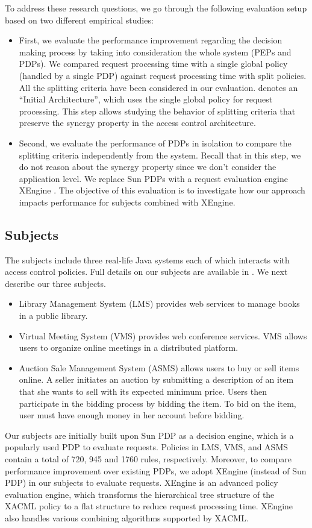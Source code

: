 To address these research questions, we go through the following evaluation setup based on two different empirical studies:
\begin{itemize}
\item First, we evaluate the performance improvement regarding the decision making process by taking into consideration the whole system 
(PEPs and PDPs). We compared request processing time with a single global policy (handled by a single PDP) against request processing time with
split policies. All the splitting criteria have been considered in our evaluation.
 denotes an ``Initial Architecture'', which uses the single global policy for request processing. 
This step allows studying the behavior of splitting criteria that preserve the synergy property in the access control architecture.

\item Second, we evaluate the performance of PDPs in isolation to compare the splitting criteria independently from the system.
Recall that in this step, we do not reason about the synergy property since we don't consider the application level.
We replace Sun PDPs with a request evaluation engine XEngine \cite{Xengine}. The objective of this evaluation is to investigate how our approach impacts performance for subjects combined with XEngine.
\end{itemize}

\subsection{Subjects}
The subjects include three real-life Java systems each of which interacts with access control policies. 
Full details on our subjects are available in \cite{evaluation}. We next describe our three subjects.
\begin{itemize}	
\item Library Management System (LMS) provides web services to manage books in a public library.
\item Virtual Meeting System (VMS) provides web conference services. VMS allows users to organize
online meetings in a distributed platform.
\item Auction Sale Management System (ASMS) allows users to buy or sell items online. A seller 
initiates an auction by submitting a description of an item that she wants to sell with its expected minimum 
price. Users then participate in the bidding process by
bidding the item. To bid on the item, user must have enough money in her account before bidding.
\end{itemize}
Our subjects are initially built upon Sun PDP \cite{sunxacml} as a decision engine, which is a popularly used PDP to evaluate
 requests. Policies in LMS, VMS, and ASMS contain a total of 720, 945 and 1760 rules, respectively.
Moreover, to compare performance improvement over existing PDPs, we adopt XEngine (instead of Sun PDP) in our subjects to evaluate requests.
XEngine is an advanced policy evaluation engine, which transforms the hierarchical tree structure of the XACML policy to a flat structure
to reduce request processing time. XEngine also handles various combining algorithms supported by XACML. 

